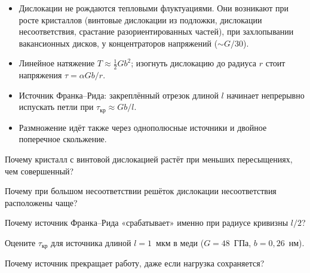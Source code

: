 \begin{itogi}
\begin{itemize}
\item Дислокации не рождаются тепловыми флуктуациями. Они возникают при
росте кристаллов (винтовые дислокации из подложки, дислокации
несоответствия, срастание разориентированных частей), при захлопывании
вакансионных дисков, у концентраторов напряжений ($\sim G/30$).
\item Линейное натяжение $T\approx\frac12Gb^2$; изогнуть дислокацию до
радиуса $r$ стоит напряжения $\tau=\alpha Gb/r$.
\item Источник Франка--Рида: закреплённый отрезок длиной $l$ начинает
непрерывно испускать петли при $\tau_{\text{кр}}\approx Gb/l$.
\item Размножение идёт также через однополюсные источники и двойное
поперечное скольжение.
\end{itemize}
\end{itogi}

\begin{proverka}
\item Почему кристалл с винтовой дислокацией растёт при меньших
пересыщениях, чем совершенный?
\item Почему при большом несоответствии решёток дислокации несоответствия
расположены чаще?
\item Почему источник Франка--Рида «срабатывает» именно при радиусе
кривизны $l/2$?
\item Оцените $\tau_{\text{кр}}$ для источника длиной $l=1$~мкм в меди
($G=48$~ГПа, $b=0{,}26$~нм).
\item Почему источник прекращает работу, даже если нагрузка сохраняется?
\end{proverka}
